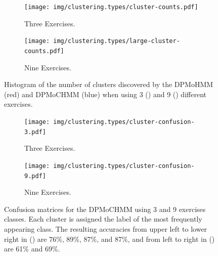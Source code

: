 \documentclass[12pt]{report}
\newcommand{\1}[0]{\mathbbm{1}}
\begin{document}
\begin{figure}[H]
    \centering
    \begin{subfigure}{\textwidth}
        \texttt{[image: img/clustering.types/cluster-counts.pdf]}
        \caption{Three Exercises.}
        \label{fig:cluster-type-counts-3}
    \end{subfigure}
    \begin{subfigure}{\textwidth}
        \texttt{[image: img/clustering.types/large-cluster-counts.pdf]}
        \caption{Nine Exercises.}
        \label{fig:cluster-type-counts-9}
    \end{subfigure}
    \caption[Number of discovered clusters]{
        Histogram of the number of clusters discovered by the DPMoHMM (red) and DPMoCHMM (blue)
        when using 3 () and 9 ()
        different exercises.
    }
    \label{fig:cluster-type-counts}
\end{figure}

\begin{figure}[H]
    \centering
    \begin{subfigure}{0.5\textwidth}
        \texttt{[image: img/clustering.types/cluster-confusion-3.pdf]}
        \caption{Three Exercises.}
        \label{fig:cluster-type-confusion-3}
    \end{subfigure}
    \begin{subfigure}{\textwidth}
        \texttt{[image: img/clustering.types/cluster-confusion-9.pdf]}
        \caption{Nine Exercises.}
        \label{fig:cluster-type-confusion-9}
    \end{subfigure}
    \caption[Clustering confusion matrices]{
        Confusion matrices for the DPMoCHMM using 3 and 9 exercises classes.
        Each cluster is assigned the label of the most frequently appearing class.
        The resulting accuracies from upper left to lower right in
        () are 76\%, 89\%, 87\%, and 87\%,
        and from left to right in () are
        61\% and 69\%.
    }
    \label{fig:cluster-type-confusion}
\end{figure}
\end{document}
